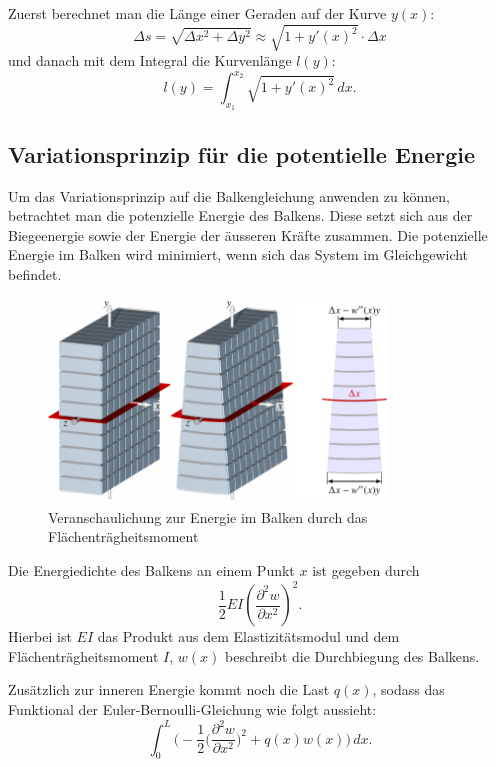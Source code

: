 Zuerst berechnet man die Länge einer Geraden auf der Kurve $y(x)$:
\begin{equation*}
	\Delta s = \sqrt{\Delta x^2 + \Delta y^2} \approx \sqrt{1 + y'(x)^2} \cdot \Delta x
\end{equation*}
und danach mit dem Integral die Kurvenlänge $l(y)$:
\begin{equation*}
	l(y) = \int_{x_1}^{x_2} \sqrt{1 + {y'(x)}^2} \, dx.
\end{equation*}

\subsection{Variationsprinzip für die potentielle Energie}
Um das Variationsprinzip auf die Balkengleichung anwenden zu können, betrachtet man die potenzielle Energie des Balkens. Diese setzt sich aus der Biegeenergie sowie der Energie der äusseren Kräfte zusammen. Die potenzielle Energie im Balken wird minimiert, wenn sich das System im Gleichgewicht befindet.
\begin{figure}
	\centering
	\includegraphics[width=0.8\textwidth]{papers/balken/images/teil2/federgesetz.pdf}
	\caption{Veranschaulichung zur Energie im Balken durch das Flächenträgheitsmoment}
	\label{fig:Veranschaulichung zur Energie im Balken durch das Flächenträgheitsmoment}
\end{figure}

Die Energiedichte des Balkens an einem Punkt $x$ ist gegeben durch
\begin{equation*}
	\frac{1}{2} E I \left( \frac{\partial^2 w}{\partial x^2} \right)^2.
\end{equation*}
Hierbei ist $E I$ das Produkt aus dem Elastizitätsmodul und dem Flächenträgheitsmoment $I$, $w(x)$ beschreibt die Durchbiegung des Balkens.

Zusätzlich zur inneren Energie kommt noch die Last $q(x)$, sodass das Funktional der Euler-Bernoulli-Gleichung wie folgt aussieht:
%
\begin{equation*}
	\int_0^L \biggl( -\frac{1}{2} \biggl( \frac{\partial^2 w}{\partial x^2} \biggr)^2 + q(x) w(x) \biggr) \, dx.
\end{equation*}

